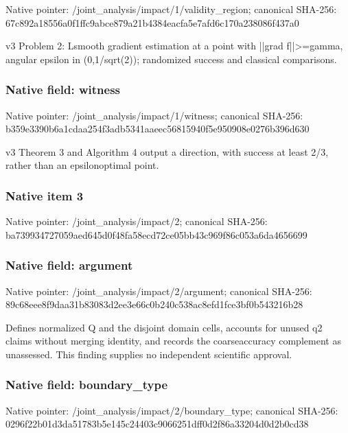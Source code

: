 \documentclass[10pt,a4paper]{article}
\begin{document}
Native pointer: /joint\_analysis/impact/1\allowbreak{}/validity\_region; canonical SHA-256: 67c892a18556a0f1ffc9abce\allowbreak{}879a21b4384eacfa5e7afd6c\allowbreak{}170a238086f437a0


v3 Problem 2: Lsmooth gradient estimation at a point with ||grad f||>=gamma, angular epsilon in (0,1/sqrt(2)); randomized success and classical comparisons.


\subsubsection{Native field: witness}


Native pointer: /joint\_analysis/impact/1/witness; canonical SHA-256: b359e3390b6a1cdaa254f3ad\allowbreak{}b5341aaeec56815940f5e950\allowbreak{}908e0276b396d630


v3 Theorem 3 and Algorithm 4 output a direction, with success at least 2/3, rather than an epsilonoptimal point.


\subsubsection{Native item 3}


Native pointer: /joint\_analysis/impact/2; canonical SHA-256: ba739934727059aed645d0f4\allowbreak{}8fa58ecd72ce05bb43c969f8\allowbreak{}6c053a6da4656699



\subsubsection{Native field: argument}


Native pointer: /joint\_analysis/impact/2/argument; canonical SHA-256: 89c68eee8f9daa31b83083d2\allowbreak{}ee3e66c0b240c538ac8efd1f\allowbreak{}ce3bf0b543216b28


Defines normalized Q and the disjoint domain cells, accounts for unused q2 claims without merging identity, and records the coarseaccuracy complement as unassessed. This finding supplies no independent scientific approval.


\subsubsection{Native field: boundary\_type}


Native pointer: /joint\_analysis/impact/2/boundary\_type; canonical SHA-256: 0296f22b01d3da51783b5e14\allowbreak{}5c24403c9066251dff0d2f86\allowbreak{}a33204d0d2b0cd38
\end{document}
